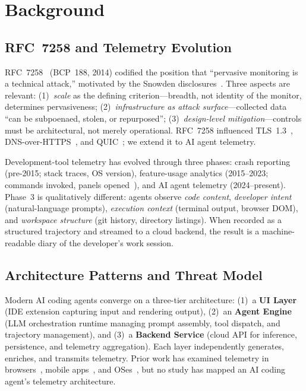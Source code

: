 \documentclass[sigconf,anonymous]{acmart}
\begin{document}
\section{Background}\label{sec:background}

\subsection{RFC~7258 and Telemetry Evolution}
\label{sec:rfc7258}

RFC~7258~\cite{rfc7258} (BCP~188, 2014) codified the position that
``pervasive monitoring is a technical attack,'' motivated by the
Snowden disclosures~\cite{snowden2013}.  Three aspects are relevant:
(1)~\emph{scale} as the defining criterion---breadth, not identity of
the monitor, determines pervasiveness;
(2)~\emph{infrastructure as attack surface}---collected data ``can be
subpoenaed, stolen, or repurposed'';
(3)~\emph{design-level mitigation}---controls must be architectural,
not merely operational.  RFC~7258 influenced TLS~1.3~\cite{tls13},
DNS-over-HTTPS~\cite{doh}, and QUIC~\cite{quic}; we extend it to
AI agent telemetry.

Development-tool telemetry has evolved through three phases:
crash reporting (pre-2015; stack traces, OS version),
feature-usage analytics (2015--2023; commands invoked, panels
opened~\cite{vscode-telemetry,jetbrains-fus}), and
AI agent telemetry (2024--present).  Phase~3 is qualitatively
different: agents observe \emph{code content}, \emph{developer intent}
(natural-language prompts), \emph{execution context} (terminal output,
browser DOM), and \emph{workspace structure} (git history, directory
listings).  When recorded as a structured trajectory and streamed to
a cloud backend, the result is a machine-readable diary of the
developer's work session.

\subsection{Architecture Patterns and Threat Model}
\label{sec:agent-arch}

Modern AI coding agents converge on a three-tier architecture:
(1)~a \textbf{UI Layer} (IDE extension capturing input and rendering
output), (2)~an \textbf{Agent Engine} (LLM orchestration runtime
managing prompt assembly, tool dispatch, and trajectory management),
and (3)~a \textbf{Backend Service} (cloud API for inference,
persistence, and telemetry aggregation).  Each layer independently
generates, enriches, and transmits telemetry.  Prior work has examined
telemetry in browsers~\cite{browser-telemetry}, mobile
apps~\cite{mobile-telemetry}, and OSes~\cite{os-telemetry}, but no
study has mapped an AI coding agent's telemetry architecture.
\end{document}
